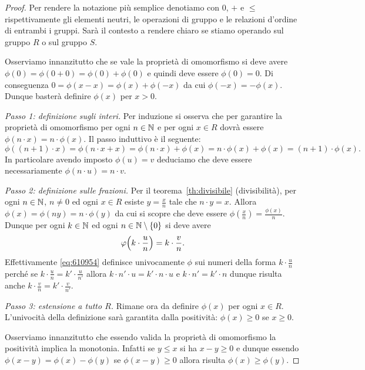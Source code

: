 \begin{proof}
Per rendere la notazione più semplice denotiamo con $0$, $+$ e $\le$ 
rispettivamente gli elementi neutri, le operazioni di gruppo 
e le relazioni d'ordine di entrambi i gruppi. 
Sarà il contesto a rendere chiaro se stiamo operando sul gruppo $R$ 
o sul gruppo $S$.

Osserviamo innanzitutto che se vale la proprietà di omomorfismo
si deve avere
$\phi(0) = \phi(0+0) = \phi(0)+\phi(0)$
e quindi deve essere $\phi(0)=0$.
Di conseguenza $0=\phi(x-x) = \phi(x)+\phi(-x)$
da cui $\phi(-x) = -\phi(x)$.
Dunque basterà definire $\phi(x)$ per $x>0$.

\emph{Passo 1: definizione sugli interi.}
Per induzione si osserva che per garantire la proprietà 
di omomorfismo per ogni $n\in {\mathbb N}$ e per ogni $x\in R$ 
dovrà essere $\phi(n\cdot x) = n\cdot \phi(x)$. 
Il passo induttivo è il seguente:
\[
  \phi((n+1)\cdot x) 
  = \phi(n\cdot x + x)
  = \phi(n\cdot x) + \phi(x)
  = n\cdot \phi(x) + \phi(x)
  = (n+1)\cdot \phi(x).
\]
In particolare avendo imposto $\phi(u)=v$ deduciamo che deve essere 
necessariamente $\phi(n\cdot u) = n\cdot v$.

\emph{Passo 2: definizione sulle frazioni.}
Per il teorema~\ref{th:divisibile} (divisibilità), per ogni $n\in {\mathbb N}$, $n\neq 0$ 
ed ogni $x\in R$ esiste $y=\frac{x}{n}$ tale che $n\cdot y=x$.
Allora $\phi(x) = \phi(ny)=n\cdot \phi(y)$ da cui 
si scopre che deve essere $\phi(\frac x n) = \frac{\phi(x)}{n}$.
Dunque per ogni $k\in {\mathbb N}$ ed ogni $n\in {\mathbb N}\setminus{\left\{ 0 \right\}}$
si deve avere 
\begin{equation}\label{eq:610954}
  \varphi{\left( k\cdot \frac u n \right)} = k \cdot \frac v n.
\end{equation}
Effettivamente \eqref{eq:610954} definisce univocamente 
$\phi$ sui numeri della forma $k\cdot \frac u n$ perché 
se $k\cdot \frac u n = k'\cdot \frac u {n'}$ allora 
$k \cdot n'\cdot  u = k' \cdot n\cdot u$
e $k\cdot n' = k'\cdot n$ dunque risulta anche 
$k\cdot \frac v n = k'\cdot \frac v {n'}$.

\emph{Passo 3: estensione a tutto $R$.}
Rimane ora da definire $\phi(x)$ per ogni $x\in R$.
L'univocità della definizione sarà garantita dalla positività:
$\phi(x)\ge 0$ se $x\ge 0$.

Osserviamo innanzitutto che essendo valida la proprietà di omomorfismo
la positività implica la monotonia. 
Infatti se $y\le x$ si ha $x-y\ge 0$
e dunque essendo $\phi(x-y) = \phi(x) - \phi(y)$
se $\phi(x-y)\ge 0$ allora risulta $\phi(x)\ge \phi(y)$. 


\end{proof}
